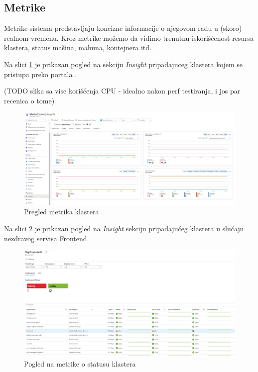 \documentclass[12pt,oneside]{memoir}
\begin{document}
\subsection{Metrike}

Metrike sistema predstavljaju koncizne informacije o njegovom radu u (skoro) realnom vremenu. Kroz metrike možemo da vidimo trenutnu iskorišćenost resursa klastera, status mašina, mahuna, kontejnera itd.

Na slici \ref{fig:aksinsights} je prikazan pogled na sekciju \emph{Insight} pripadajuceg klastera kojem se pristupa preko portala \cite{AzurePortal}. 

(TODO slika sa vise korišćenja CPU - idealno nakon perf testiranja, i jos par recenica o tome)

\begin{figure}[!ht]
  \centering
  \includegraphics[width=1\textwidth]{./images/aks_insights.png}
  \caption{Pregled metrika klastera}
  \label{fig:aksinsights}
\end{figure}

Na slici \ref{fig:clusterunhealthy} je prikazan pogled na \emph{Insight} sekciju pripadajućeg klastera u slučaju nezdravog servisa Frontend.

\begin{figure}[!ht]
  \centering
  \includegraphics[width=1\textwidth]{./images/metrics_cluster_unhealthy.png}
  \caption{Pogled na metrike o statusu klastera}
  \label{fig:clusterunhealthy}
\end{figure}
\end{document}
